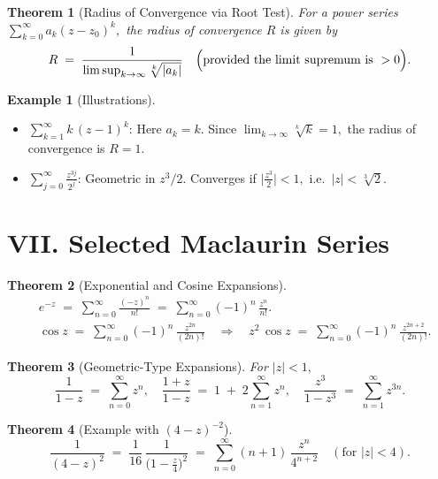 \documentclass[12pt]{article}
\theoremstyle{plain}
\newtheorem{theorem}{Theorem}
\theoremstyle{definition}
\newtheorem{example}{Example}
\begin{document}
\begin{theorem}[Radius of Convergence via Root Test]
\label{thm:radius-of-convergence}
For a power series 
\(\displaystyle \sum_{k=0}^{\infty} a_k (z - z_0)^k,\)
the radius of convergence \(R\) is given by
\[
R 
\;=\;
\frac{1}{\limsup_{k \to \infty} \sqrt[k]{|a_k|}}
\quad
\Bigl(\text{provided the limit supremum is }>0\Bigr).
\]
\end{theorem}

\begin{example}[Illustrations]
\ 
\begin{itemize}
\item \(\displaystyle \sum_{k=1}^{\infty} k\,(z-1)^k\):
\quad
Here \(a_k = k\).  Since \(\lim_{k\to \infty}\sqrt[k]{k}=1,\) the radius of convergence is \(R=1.\)

\item \(\displaystyle \sum_{j=0}^{\infty}\frac{z^{3j}}{2^j}\):
\quad
Geometric in \(z^3/2\).  Converges if \(\bigl|\tfrac{z^3}{2}\bigr|<1,\) i.e.\ \(|z|<\sqrt[3]{2}.\)
\end{itemize}
\end{example}

\section*{VII. Selected Maclaurin Series}

\begin{theorem}[Exponential and Cosine Expansions]
\ 
\begin{align*}
& e^{-z} 
  \;=\;
  \sum_{n=0}^\infty \frac{(-z)^n}{n!}
  \;=\;
  \sum_{n=0}^\infty 
  (-1)^n \,\frac{z^n}{n!}.
\\[6pt]
& \cos z
  \;=\;
  \sum_{n=0}^\infty (-1)^n \,\frac{z^{2n}}{(2n)!}
  \quad\Longrightarrow\quad
  z^2\,\cos z
  \;=\;
  \sum_{n=0}^\infty (-1)^n \,\frac{z^{2n+2}}{(2n)!}.
\end{align*}
\end{theorem}

\begin{theorem}[Geometric-Type Expansions]
For \(|z|<1,\)
\[
\frac{1}{1-z} \;=\; \sum_{n=0}^{\infty} z^n,
\quad
\frac{1+z}{1-z}
\;=\;
1 \;+\; 2\sum_{n=1}^\infty z^n,
\quad
\frac{z^3}{1 - z^3}
\;=\;
\sum_{n=1}^\infty z^{3n}.
\]
\end{theorem}

\begin{theorem}[Example with \((4 - z)^{-2}\)]
\[
\frac{1}{(4 - z)^2}
\;=\;
\frac{1}{16}\,\frac{1}{\bigl(1 - \tfrac{z}{4}\bigr)^2}
\;=\;
\sum_{n=0}^\infty 
(n+1)\,\frac{z^n}{4^{n+2}}
\quad (\text{for }|z|<4).
\]
\end{theorem}
\end{document}
